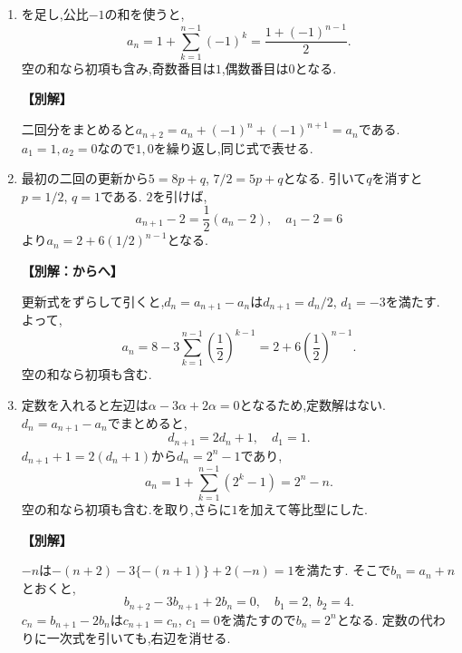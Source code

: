 \begin{enumerate}[label=\textbf{問\arabic*.},leftmargin=3.8em,format=\bookitemlink{practice-basic}{solution}{problem}]
          \item {}を足し,公比$-1$の和を使うと,
                  \[
                    a_n=1+\sum_{k=1}^{n-1}(-1)^k
                       =\frac{1+(-1)^{n-1}}2.
                  \]
                  空の和なら初項も含み,奇数番目は$1$,偶数番目は$0$となる.
                  \par\smallskip\noindent\textbf{【別解】}\par
                  二回分をまとめると$a_{n+2}=a_n+(-1)^n+(-1)^{n+1}=a_n$である.
                  $a_1=1,a_2=0$なので$1,0$を繰り返し,同じ式で表せる.

          \item 最初の二回の更新から$5=8p+q$, $7/2=5p+q$となる.
                  引いて$q$を消すと$p=1/2$, $q=1$である.
                  $2$を引けば,
                  \[
                    a_{n+1}-2=\frac12(a_n-2),\quad a_1-2=6
                  \]
                  より$a_n=2+6(1/2)^{n-1}$となる.
                  \par\smallskip\noindent\textbf{【別解：からへ】}\par
                  更新式をずらして引くと,$d_n=a_{n+1}-a_n$は$d_{n+1}=d_n/2$, $d_1=-3$を満たす.
                  よって,
                  \[
                    a_n=8-3\sum_{k=1}^{n-1}\left(\frac12\right)^{k-1}
                       =2+6\left(\frac12\right)^{n-1}.
                  \]
                  空の和なら初項も含む.

          \item 定数を入れると左辺は$\alpha-3\alpha+2\alpha=0$となるため,定数解はない.
                  $d_n=a_{n+1}-a_n$でまとめると,
                  \[
                    d_{n+1}=2d_n+1,\quad d_1=1.
                  \]
                  $d_{n+1}+1=2(d_n+1)$から$d_n=2^n-1$であり,
                  \[
                    a_n=1+\sum_{k=1}^{n-1}(2^k-1)=2^n-n.
                  \]
                  空の和なら初項も含む.を取り,さらに$1$を加えて等比型にした.
                  \par\smallskip\noindent\textbf{【別解】}\par
                  $-n$は$-(n+2)-3\{-(n+1)\}+2(-n)=1$を満たす.
                  そこで$b_n=a_n+n$とおくと,
                  \[
                    b_{n+2}-3b_{n+1}+2b_n=0,\quad b_1=2,\ b_2=4.
                  \]
                  $c_n=b_{n+1}-2b_n$は$c_{n+1}=c_n$, $c_1=0$を満たすので$b_n=2^n$となる.
                  定数の代わりに一次式を引いても,右辺を消せる.


\end{enumerate}
